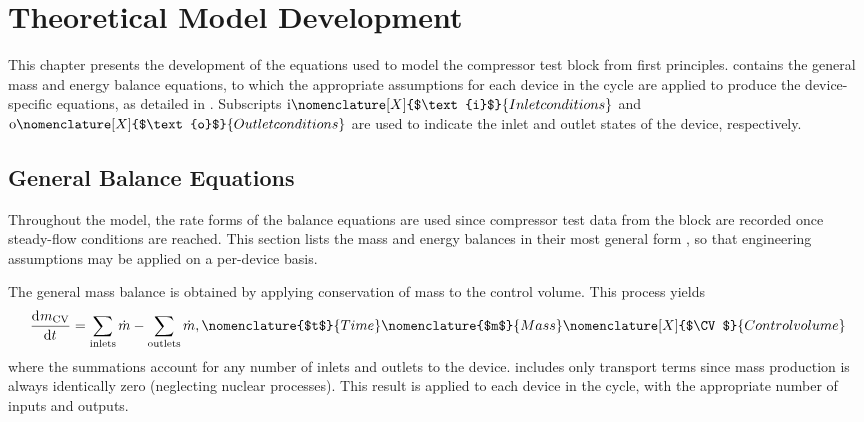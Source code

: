 \chapter{Theoretical Model Development} \label{cha:modeldev}
This chapter presents the development of the equations used to model 
the compressor test block from first principles. 
 contains the general mass and energy balance equations, 
to which the appropriate assumptions for each device in the cycle are applied 
to produce the device-specific equations, as detailed in . 
Subscripts $\text{i}\nomenclature[X]{$\text{i}$}{Inlet conditions}$ 
and $\text{o}\nomenclature[X]{$\text{o}$}{Outlet conditions}$ 
are used to indicate the inlet and outlet states of the device, respectively. 

\section{General Balance Equations} \label{sec:GenBal}
Throughout the model, the rate forms of the balance equations are used 
since compressor test data from the block are recorded once steady-flow conditions are reached. 
This section lists the mass and energy balances in their most general form \citep{cengel2011}, 
so that engineering assumptions may be applied on a per-device basis.

The general mass balance is obtained by 
applying conservation of mass to the control volume. 
This process yields
\begin{equation}
	\dod{m_\CV}{t} = \sum_{\text{inlets}}{\dot{m}} - \sum_{\text{outlets}}{\dot{m}},
  \label{eqn:GenMass}
	\nomenclature{$t$}{Time\nomunit{\minute}} 
  \nomenclature{$m$}{Mass\nomunit{\poundmass}} 
	\nomenclature[X]{$\CV$}{Control volume}
\end{equation}
where the summations account for any number of inlets and outlets to the device.
 includes only transport terms since mass production is 
always identically zero (neglecting nuclear processes).
This result is applied to each device in the cycle, with the appropriate number of inputs and outputs.

